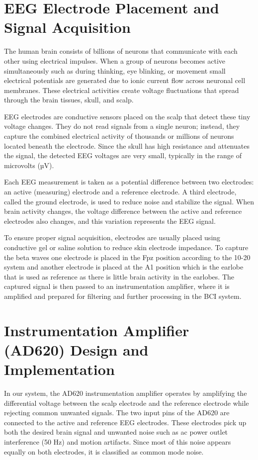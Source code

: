 \section{EEG Electrode Placement and Signal Acquisition}
The human brain consists of billions of neurons that communicate with each other using electrical impulses. When a group of neurons becomes active simultaneously such as during thinking, eye blinking, or movement small electrical potentials are generated due to ionic current flow across neuronal cell membranes. These electrical activities create voltage fluctuations that spread through the brain tissues, skull, and scalp.

EEG electrodes are conductive sensors placed on the scalp that detect these tiny voltage changes. They do not read signals from a single neuron; instead, they capture the combined electrical activity of thousands or millions of neurons located beneath the electrode. Since the skull has high resistance and attenuates the signal, the detected EEG voltages are very small, typically in the range of microvolts (µV).

Each EEG measurement is taken as a potential difference between two electrodes: an active (measuring) electrode and a reference electrode. A third electrode, called the ground electrode, is used to reduce noise and stabilize the signal. When brain activity changes, the voltage difference between the active and reference electrodes also changes, and this variation represents the EEG signal.

To ensure proper signal acquisition, electrodes are usually placed using conductive gel or saline solution to reduce skin electrode impedance. To capture the beta waves one electrode is placed in the Fpz position according to the 10-20 system and another electrode is placed at the A1 position which is the earlobe that is used as reference as there is little brain activity in the earlobes. The captured signal is then passed to an instrumentation amplifier, where it is amplified and prepared for filtering and further processing in the BCI system.

\section{Instrumentation Amplifier (AD620) Design and Implementation}
In our system, the AD620 instrumentation amplifier operates by amplifying the differential voltage between the scalp electrode and  the reference electrode while rejecting common unwanted signals. The two input pins of the AD620 are connected to the active and reference EEG electrodes. These electrodes pick up both the desired brain signal and unwanted noise such as ac power outlet interference (50 Hz) and motion artifacts. Since most of this noise appears equally on both electrodes, it is classified as common mode noise.

